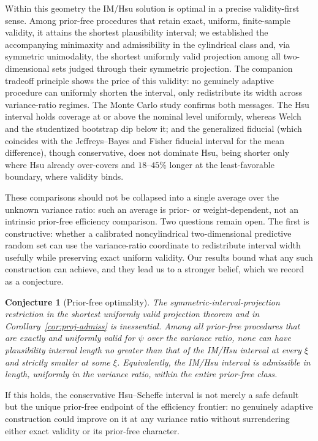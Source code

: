 \documentclass[12pt]{article}
\newtheorem{conjecture}{Conjecture}
\begin{document}
Within this geometry the IM/Hsu solution is optimal in a precise validity-first
sense.  Among prior-free procedures that retain exact, uniform, finite-sample
validity, it attains the shortest plausibility interval; we established the
accompanying minimaxity and admissibility in the cylindrical class and, via
symmetric unimodality, the shortest uniformly valid projection among all
two-dimensional sets judged through their symmetric projection.  The companion
tradeoff principle shows the price of this validity: no genuinely adaptive
procedure can uniformly shorten the interval, only redistribute its width across
variance-ratio regimes.  The Monte Carlo study confirms both messages.  The Hsu
interval holds coverage at or above the nominal level uniformly, whereas Welch and
the studentized bootstrap dip below it; and the generalized fiducial (which
coincides with the Jeffreys--Bayes and Fisher fiducial interval for the mean
difference), though conservative, does not dominate Hsu, being shorter only where
Hsu already over-covers and \(18\)--\(45\%\) longer at the least-favorable
boundary, where validity binds.

These comparisons should not be collapsed into a single average over the unknown
variance ratio: such an average is prior- or weight-dependent, not an intrinsic
prior-free efficiency comparison.  Two questions remain open.  The first is
constructive: whether a calibrated noncylindrical two-dimensional predictive
random set can use the variance-ratio coordinate to redistribute interval width
usefully while preserving exact uniform validity.  Our results bound what any such
construction can achieve, and they lead us to a stronger belief, which we record
as a conjecture.

\begin{conjecture}[Prior-free optimality]
\label{conj:prior-free}
The symmetric-interval-projection restriction in the shortest uniformly valid
projection theorem and in Corollary~\ref{cor:proj-admiss} is inessential.  Among
all prior-free procedures that are exactly and uniformly valid for \(\psi\) over
the variance ratio, none can have plausibility interval length no greater than
that of the IM/Hsu interval at every \(\xi\) and strictly smaller at some
\(\xi\).  Equivalently, the IM/Hsu interval is admissible in length, uniformly in
the variance ratio, within the entire prior-free class.
\end{conjecture}

If this holds, the conservative Hsu--Scheffe interval is not merely a safe default
but the unique prior-free endpoint of the efficiency frontier: no genuinely
adaptive construction could improve on it at any variance ratio without
surrendering either exact validity or its prior-free character.
\end{document}
